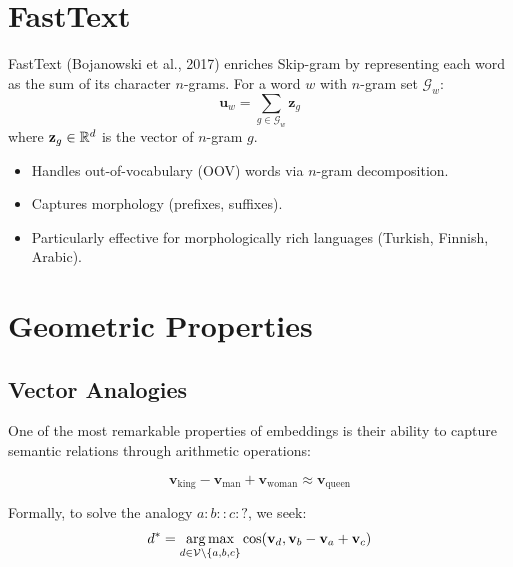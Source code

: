 \section{FastText}
\label{sec:emb:fasttext}

\begin{definition}[FastText]
FastText (Bojanowski et al., 2017) enriches Skip-gram by representing each word
as the sum of its character $n$-grams. For a word $w$ with $n$-gram set
$\mathcal{G}_w$:
\[
\mathbf{u}_w = \sum_{g \in \mathcal{G}_w} \mathbf{z}_g
\]
where $\mathbf{z}_g \in \mathbb{R}^d$ is the vector of $n$-gram $g$.
\end{definition}

\begin{bestpractice}[title=\textbf{FastText advantages}]
\begin{itemize}
    \item Handles out-of-vocabulary (OOV) words via $n$-gram decomposition.
    \item Captures morphology (prefixes, suffixes).
    \item Particularly effective for morphologically rich languages (Turkish,
          Finnish, Arabic).
\end{itemize}
\end{bestpractice}

\section{Geometric Properties}
\label{sec:emb:geometry}

\subsection{Vector Analogies}

One of the most remarkable properties of embeddings is their ability to capture
semantic relations through arithmetic operations:

\begin{example}
\[
\mathbf{v}_{\text{king}} - \mathbf{v}_{\text{man}} + \mathbf{v}_{\text{woman}} \approx \mathbf{v}_{\text{queen}}
\]
\end{example}

Formally, to solve the analogy $a : b :: c : ?$, we seek:
\[
d^* = \operatorname*{arg\,max}_{d \in \mathcal{V} \setminus \{a,b,c\}} \cos(\mathbf{v}_d, \mathbf{v}_b - \mathbf{v}_a + \mathbf{v}_c)
\]

